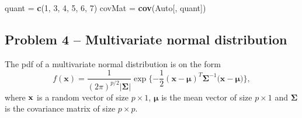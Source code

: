 \documentclass[]{article}
\newenvironment{Shaded}{\begin{snugshade}}{\end{snugshade}}
\newcommand{\DecValTok}[1]{\textcolor[rgb]{0.00,0.00,0.81}{#1}}
\newcommand{\KeywordTok}[1]{\textcolor[rgb]{0.13,0.29,0.53}{\textbf{#1}}}
\newcommand{\NormalTok}[1]{#1}
\newcommand{\StringTok}[1]{\textcolor[rgb]{0.31,0.60,0.02}{#1}}
\begin{document}
\begin{Shaded}
\begin{Highlighting}[]
\NormalTok{quant =}\StringTok{ }\KeywordTok{c}\NormalTok{(}\DecValTok{1}\NormalTok{, }\DecValTok{3}\NormalTok{, }\DecValTok{4}\NormalTok{, }\DecValTok{5}\NormalTok{, }\DecValTok{6}\NormalTok{, }\DecValTok{7}\NormalTok{)}
\NormalTok{covMat =}\StringTok{ }\KeywordTok{cov}\NormalTok{(Auto[, quant])}
\end{Highlighting}
\end{Shaded}

\hypertarget{problem-4-multivariate-normal-distribution}{%
\subsection{Problem 4 -- Multivariate normal
distribution}\label{problem-4-multivariate-normal-distribution}}

The pdf of a multivariate normal distribution is on the form
\[ f(\boldsymbol{x}) = \frac{1}{(2\pi)^{p/2}|\boldsymbol{\Sigma|}} \exp\{-\frac{1}{2}(\boldsymbol{x-\mu})^T\boldsymbol{\Sigma}^{-1}(\boldsymbol{x-\mu)}\},\]
where \(\bf{x}\) is a random vector of size \(p\times 1\),
\(\boldsymbol{\mu}\) is the mean vector of size \(p\times 1\) and
\(\boldsymbol{\Sigma}\) is the covariance matrix of size \(p\times p\).
\end{document}
